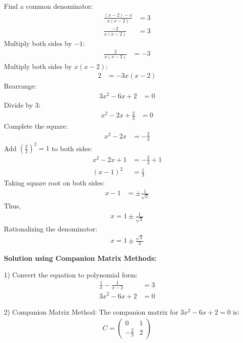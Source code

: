 \documentclass[journal]{IEEEtran}
\begin{document}
Find a common denominator:
\begin{align}
    \frac{(x-2) - x}{x(x-2)} &= 3 \\
    \frac{-2}{x(x-2)} &= 3
\end{align}
Multiply both sides by $-1$:
\begin{align}
    \frac{2}{x(x-2)} &= -3
\end{align}
Multiply both sides by $x(x-2)$:
\begin{align}
    2 &= -3x(x-2)
\end{align}
Rearrange:
\begin{align}
    3x^2 - 6x + 2 &= 0
\end{align}
Divide by 3:
\begin{align}
    x^2 - 2x + \frac{2}{3} &= 0
\end{align}
Complete the square:
\begin{align}
    x^2 - 2x &= -\frac{2}{3}
\end{align}
Add $\left(\frac{2}{2}\right)^2 = 1$ to both sides:
\begin{align}
    x^2 - 2x + 1 &= -\frac{2}{3} + 1 \\
    (x-1)^2 &= \frac{1}{3}
\end{align}
Taking square root on both sides:
\begin{align}
    x - 1 &= \pm \frac{1}{\sqrt{3}}
\end{align}
Thus,
\begin{align}
    x = 1 \pm \frac{1}{\sqrt{3}}
\end{align}
Rationalizing the denominator:
\begin{align}
    x = 1 \pm \frac{\sqrt{3}}{3}
\end{align}

\textbf{Solution using Companion Matrix Methods:}

1) Convert the equation to polynomial form:
   \begin{align}
   \frac{1}{x} - \frac{1}{x-2} &= 3 \\
   3x^2 - 6x + 2 &= 0
   \end{align}

2) Companion Matrix Method:
   The companion matrix for $3x^2 - 6x + 2 = 0$ is:
   \begin{align}
   C = \begin{pmatrix}
   0 & 1 \\
   -\frac{2}{3} & 2
   \end{pmatrix}
   \end{align}
\end{document}
